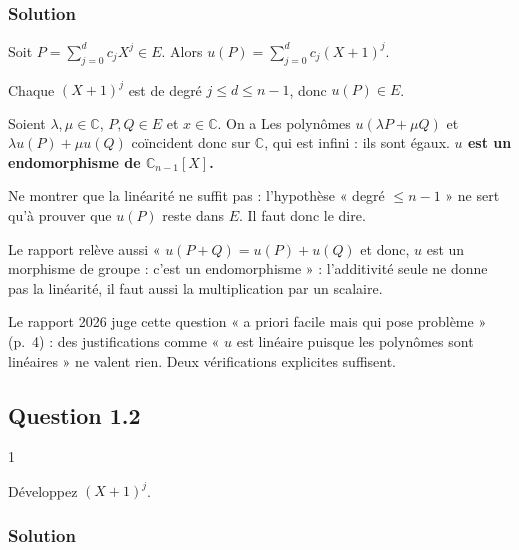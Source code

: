 \documentclass[11pt,a4paper]{article}
\newcommand{\equationajustee}[1]{%
  \sbox{\boiteequation}{$\displaystyle #1$}%
  \ifdim\wd\boiteequation>\linewidth
    \[\resizebox{\linewidth}{!}{\usebox{\boiteequation}}\]%
  \else
    \[#1\]%
  \fi}
\begin{document}
\hypertarget{solution}{%
\subsubsection{Solution}\label{solution}}

Soit \(P=\sum_{j=0}^{d}c_jX^j\in E\). Alors \(u(P)=\sum_{j=0}^dc_j(X+1)^j\).

Chaque \((X+1)^j\) est de degré \(j\le d\le n-1\), donc \(u(P)\in E\).

Soient \(\lambda,\mu\in\mathbb C\), \(P,Q\in E\) et \(x\in\mathbb C\). On a
\equationajustee{(\lambda P+\mu Q)(x+1)=\lambda P(x+1)+\mu Q(x+1).}
Les polynômes \(u(\lambda P+\mu Q)\) et \(\lambda u(P)+\mu u(Q)\) coïncident donc sur \(\mathbb C\), qui est infini : ils sont égaux. \textbf{\(u\) est un endomorphisme de \(\mathbb C_{n-1}[X]\).}

\begin{piege}

Ne montrer que la linéarité ne suffit pas : l'hypothèse « degré \(\le n-1\) » ne sert qu'à prouver que \(u(P)\) reste dans \(E\). Il faut donc le dire.

Le rapport relève aussi « \(u(P+Q)=u(P)+u(Q)\) et donc, \(u\) est un morphisme de groupe : c'est un endomorphisme » : l'additivité seule ne donne pas la linéarité, il faut aussi la multiplication par un scalaire.

\end{piege}

\begin{jury}

Le rapport 2026 juge cette question « a priori facile mais qui pose problème » (p.~4) : des justifications comme « \(u\) est linéaire puisque les polynômes sont linéaires » ne valent rien. Deux vérifications explicites suffisent.

\end{jury}

\hypertarget{question-1.2}{%
\subsection{Question 1.2}\label{question-1.2}}

\begin{indication}{1}

Développez \((X+1)^j\).

\end{indication}

\hypertarget{solution-1}{%
\subsubsection{Solution}\label{solution-1}}
\end{document}
